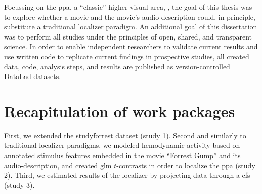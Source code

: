 Focussing on the \ac{ppa}, a ``classic'' higher-visual area,
\citep{epstein1998ppa}, the goal of this thesis was to explore whether a movie
and the movie's audio-description could, in principle, substitute a traditional
localizer paradigm.
An additional goal of this dissertation was to perform all studies under the
principles of open, shared, and transparent science.
%
In order to enable independent researchers to validate current results and use
written code to replicate current findings in prospective studies, all created
data, code, analysis steps, and results are published as version-controlled
DataLad \citep[\href{www.datalad.org}{datalad.org};][]{halchenko2021datalad}
datasets.


\section{Recapitulation of work packages}




%
First, we extended the studyforrest dataset (study 1).
%
Second and similarly to traditional localizer paradigms, we modeled hemodynamic
activity based on annotated stimulus features embedded in the movie ``Forrest
Gump'' and its audio-description, and created \ac{glm} $t$-contrasts in order to
localize the \ac{ppa} (study 2).
%
Third, we estimated results of the localizer by projecting data through a
\ac{cfs} (study 3).



